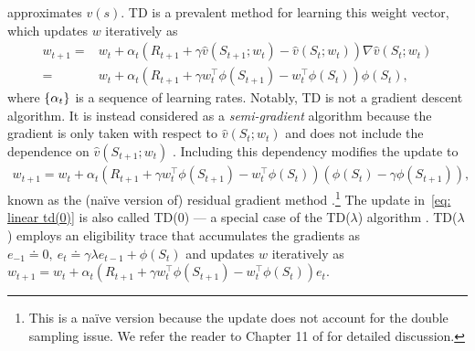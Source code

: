 \documentclass{article}
\begin{document}
approximates $v(s)$.
TD is a prevalent method for learning this weight vector,
which updates $w$ iteratively as
\begin{align}
    w_{t+1} =& w_t + \alpha_t \left(R_{t+1} + \gamma \hat{v}\left(S_{t+1};w_t\right) - \hat{v}\left(S_{t};w_t\right)\right) \nabla \hat{v}\left(S_{t};w_t\right) \\
    =& w_t + \alpha_t \left(R_{t+1} + \gamma w_t^\top \phi(S_{t+1}) - w_t^\top \phi(S_t)\right) \phi(S_t), \label{eq: linear td(0)}
\end{align}
where $\qty{\alpha_t}$ is a sequence of learning rates.  
Notably, TD is not a gradient descent algorithm.
It is instead considered as a \emph{semi-gradient} algorithm because the gradient is only taken with respect to $\hat{v}\left(S_{t};w_t\right)$ and does not include the dependence on $\hat{v}\left(S_{t+1};w_t\right)$ \citep{sutton2018reinforcement}. 
Including this dependency modifies the update to 
\begin{align}
    w_{t+1} = w_t + \alpha_t \left(R_{t+1} + \gamma w_t^\top \phi(S_{t+1}) - w_t^\top \phi(S_t)\right) \left(\phi(S_t)- \gamma\phi(S_{t+1}) \right), \label{eq: residual grad td(0)}
\end{align}
known as the (naïve version of) residual gradient method \citep{baird1995residual}.\footnote{This is a naïve version because the update does not account for the double sampling issue. We refer the reader to Chapter 11 of \citet{sutton2018reinforcement} for detailed discussion.}
The update in~\eqref{eq: linear td(0)} is also called TD(0) --- a special case of the TD($\lambda$) algorithm \citep{sutton1988learning}.
TD($\lambda$) employs an eligibility trace that accumulates the gradients as
    $e_{-1} \doteq 0, \ e_{t} \doteq \gamma\lambda e_{t-1} + \phi(S_t)$ and updates $w$ iteratively as
    $w_{t+1} = w_t + \alpha_t (R_{t+1} + \gamma w_t^\top \phi(S_{t+1}) - w_t^\top \phi(S_t)) e_t$.
\end{document}
